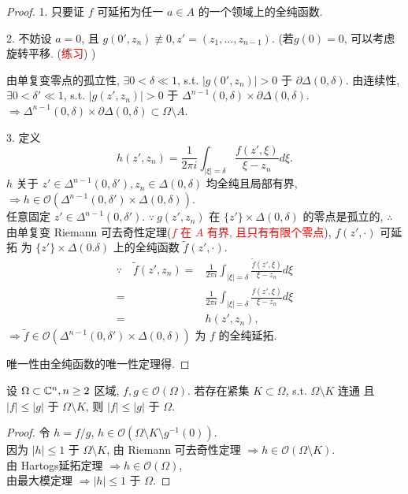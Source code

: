 \begin{proof}
  1. 只要证 $f$  可延拓为任一 $a \in A$  的一个领域上的全纯函数.

  2. 不妨设 $a=0$, 且 $g(0',z_n) \not \equiv 0, z'=(z_1,\dots,z_{n-1})$. (若$g(0)=0$, 可以考虑旋转平移. (\textcolor{red}{练习}) )  

  由单复变零点的孤立性, $\exists 0< \delta \ll 1$, s.t. $|g(0',z_n)|>0$ 于 $\partial \Delta (0, \delta )$. 
  由连续性, $\exists 0< \delta ' \ll 1$, s.t. $|g(z',z_n) |>0$ 于 $\Delta ^{n-1}(0,\delta ) \times \partial \Delta (0,\delta )$. \\
  $\Rightarrow \Delta ^{n-1}(0,\delta ) \times \partial \Delta (0,\delta ) \subset \Omega \setminus A$.
  
  3. 定义 
  $$ h(z',z_n)=\frac{1}{2 \pi  i} \int_{|\xi |=\delta } \frac{f(z',\xi )}{\xi -z_n} d \xi .$$
  $h$ 关于 $z' \in \Delta ^{n-1}(0,\delta '),z_n \in \Delta (0,\delta )$ 均全纯且局部有界, \\
   $\Rightarrow  h \in \mathcal{O}(\Delta ^{n-1}(0,\delta ') \times \Delta (0,\delta ))$.  \\
   任意固定 $z' \in \Delta ^{n-1}(0,\delta ')$. $\because ~ g(z',z_n)$ 在 $\{z'\} \times \Delta (0,\delta )$ 的零点是孤立的, $\therefore $ 由单复变 Riemann 可去奇性定理(\textcolor{red}{$f$ 在 $A$ 有界, 且只有有限个零点}), $f(z', \cdot )$ 可延拓 为 $\{z'\} \times \Delta (0.\delta )$ 上的全纯函数 $\tilde{f}(z',\cdot )$. 
   $$\begin{aligned}
    \because \quad \tilde{f}(z',z_n )=&\frac{1}{2 \pi  i} \int_{|\xi |=\delta } \frac{\tilde{f}(z',\xi )}{\xi -z_n} d \xi \\
    =&\frac{1}{2 \pi  i} \int_{|\xi |=\delta } \frac{f(z',\xi )}{\xi -z_n} d \xi \\
    =& h(z',z_n),
   \end{aligned}  $$      
   $\Rightarrow  \tilde{f} \in \mathcal{O}(\Delta ^{n-1}(0,\delta ') \times \Delta (0,\delta ))$ 为 $f$ 的全纯延拓. 
   
   唯一性由全纯函数的唯一性定理得.
\end{proof}

\begin{corollary}
  设 $\Omega \subset {\mathbb C}^n,n \geq 2$  区域, $f,g \in \mathcal{O}(\Omega )$. 
  若存在紧集 $K \subset \Omega $, s.t. $\Omega \setminus K$ 连通 且 $|f| \leq |g|$ 于 $\Omega \setminus K$, 
  则 $|f| \leq |g|$ 于 $\Omega $.      
\end{corollary}
\begin{proof}
  令 $h=f/g$, $h \in \mathcal{O}(\Omega \setminus K \setminus g^{-1}(0))$. \\ 
  因为 $|h| \leq 1$  于 $\Omega \setminus K$, 由 Riemann 可去奇性定理 
  $\Rightarrow h \in \mathcal{O}(\Omega \setminus K)$.\\
  由 Hartogs延拓定理 $\Rightarrow h \in \mathcal{O}(\Omega )$, \\
  由最大模定理 $\Rightarrow |h| \leq 1$ 于 $\Omega $.   
\end{proof}

